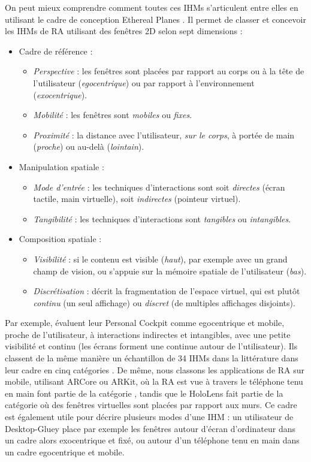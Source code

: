 On peut mieux comprendre comment toutes ces IHMs s'articulent entre elles en utilisant le cadre de conception Ethereal Planes \citep{Ens2014a}. Il permet de classer et concevoir les IHMs de RA utilisant des fenêtres 2D selon sept dimensions :
\begin{itemize}
  \item Cadre de référence :
  \begin{itemize}
    \item \emph{Perspective} : les fenêtres sont placées par rapport au corps ou à la tête de l'utilisateur (\emph{egocentrique}) ou par rapport à l'environnement (\emph{exocentrique}).
    \item \emph{Mobilité} : les fenêtres sont \emph{mobiles} ou \emph{fixes}.
    \item \emph{Proximité} : la distance avec l'utilisateur, \emph{sur le corps}, à portée de main (\emph{proche}) ou au-delà (\emph{lointain}).
  \end{itemize}
  \item Manipulation spatiale :
  \begin{itemize}
    \item \emph{Mode d'entrée} : les techniques d'interactions sont soit \emph{directes} (écran tactile, main virtuelle), soit \emph{indirectes} (pointeur virtuel).
    \item \emph{Tangibilité} : les techniques d'interactions sont \emph{tangibles} ou \emph{intangibles}.
  \end{itemize}
  \item Composition spatiale :
  \begin{itemize}
    \item \emph{Visibilité} : si le contenu est visible (\emph{haut}), par exemple avec un grand champ de vision, ou s'appuie sur la mémoire spatiale de l'utilisateur (\emph{bas}).
    \item \emph{Discrétisation} : décrit la fragmentation de l'espace virtuel, qui est plutôt \emph{continu} (un seul affichage) ou \emph{discret} (de multiples affichages disjoints).
  \end{itemize}
\end{itemize}
\medskip

Par exemple, \cite{Ens2014a} évaluent leur Personal Cockpit comme egocentrique et mobile, proche de l'utilisateur, à interactions indirectes et intangibles, avec une petite visibilité et continu (les écrans forment une  continue autour de l'utilisateur). Ils classent de la même manière un échantillon de 34 IHMs dans la littérature dans leur cadre en cinq catégories . De même, nous classons les applications de RA sur mobile, utilisant ARCore ou ARKit, où la RA est vue à travers le téléphone tenu en main font partie de la catégorie , tandis que le HoloLens fait partie de la catégorie  où des fenêtres virtuelles sont placées par rapport aux murs. Ce cadre est également utile pour décrire plusieurs modes d'une IHM : un utilisateur de Desktop-Gluey place par exemple les fenêtres autour d'écran d'ordinateur dans un cadre alors exocentrique et fixé, ou autour d'un téléphone tenu en main dans un cadre egocentrique et mobile.

